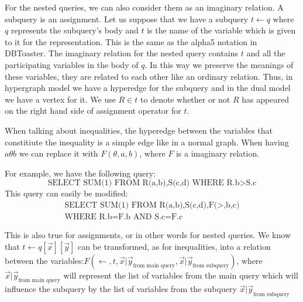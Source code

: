\documentclass[12pt]{article}
\begin{document}
For the nested queries, we can also consider them as an imaginary relation. A subquery is an assignment. Let us suppose that we have a subquery $t\gets q$ where $q$ represents the subquery's body and $t$ is the name of the variable which is given to it for the representation. This is the same as the alpha5 notation in DBToaster\cite{1}. The imaginary relation for the nested query contains $t$ and all the participating variables in the body of $q$. In this way we preserve the meanings of these variables, they are related to each other like an ordinary relation. Thus, in hypergraph model we have a hyperedge for the subquery and in the dual model we have a vertex for it. We use $R\in t$ to denote whether or not $R$ has appeared on the right hand side of assignment operator for $t$. \\\par
When talking about inequalities, the hyperedge between the variables that constitiute the inequality is a simple edge like in a normal graph. When having $a\theta b$ we can replace it with $F(\theta,a,b)$, where $F$ is a imaginary relation. 

For example, we have the following query:
$$\mbox{SELECT SUM(1) FROM R(a,b),S(c,d) WHERE R.b$>$S.c}$$
This query can easily be modified:
\begin{align*}
\mbox{SELECT SUM(1) FROM R(a,b),S(c,d),F($>$,b,c)}\\\mbox{WHERE R.b=F.b AND S.c=F.c}
\end{align*}

This is also true for assignments, or in other words for nested queries. We know that $t\gets q[\vec{x}][\vec{y}]$ can be transformed, as for inequalities, into a relation between the variables:$F(\gets,t,{\vec{x}|\vec{y}}_{\mbox{from main query}},{\vec{x}|\vec{y}}_{\mbox{from subquery}})$, where ${\vec{x}|\vec{y}}_{\mbox{from main query}}$ will represent the list of variables from the main query which will influence the subquery by the list of variables from the subquery $ {\vec{x}|\vec{y}}_{\mbox{from subquery}}$
\end{document}

